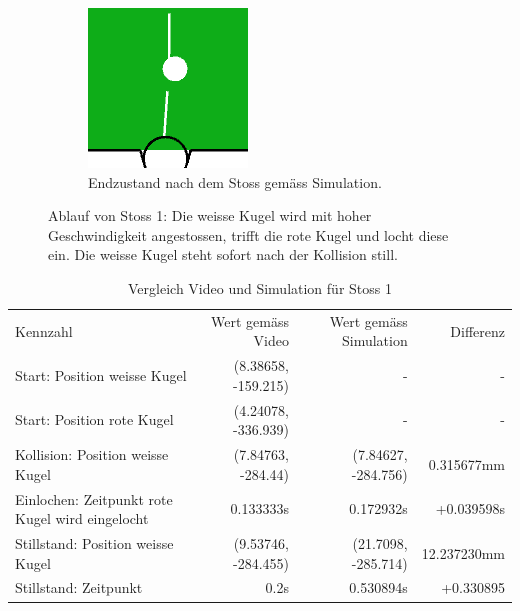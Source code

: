 \begin{figure}[h!]
\begin{subfigure}[t]{0.2\textwidth}
        \includegraphics[width=1.0\linewidth]{../common/04_results/resources/simulation_vs_reality/simulation_vs_reality_1_0008_0011_simulation_cut.png}
        \caption{Endzustand nach dem Stoss gemäss Simulation.}
        \label{fig:simulation_vs_reality_1_0008_0011_simulation}
    \end{subfigure}
    \caption{
        Ablauf von Stoss 1: Die weisse Kugel wird mit hoher Geschwindigkeit angestossen, trifft die rote Kugel und locht diese ein.
        Die weisse Kugel steht sofort nach der Kollision still.
    }
    \label{fig:simulation_vs_reality_1_0008_0011}
\end{figure}

\begin{table}[ht]
    \begin{tabular}{ lrrr }
        \rowcolor{\seccolor!50}
        Kennzahl & Wert gemäss Video & Wert gemäss Simulation & Differenz \\
        Start: Position weisse Kugel & (8.38658, -159.215) & - & -\\
        Start: Position rote Kugel & (4.24078, -336.939) & - & -\\
        Kollision: Position weisse Kugel & (7.84763, -284.44) & (7.84627, -284.756) & 0.315677mm\\
        Einlochen: Zeitpunkt rote Kugel wird eingelocht & 0.133333s & 0.172932s & +0.039598s\\
        Stillstand: Position weisse Kugel & (9.53746, -284.455) & (21.7098, -285.714) & 12.237230mm\\
        Stillstand: Zeitpunkt & 0.2s & 0.530894s & +0.330895\\
    \end{tabular}
    \caption{Vergleich Video und Simulation für Stoss 1}
    \label{tab:simulation_vs_reality_1_0008_0011}
\end{table}

